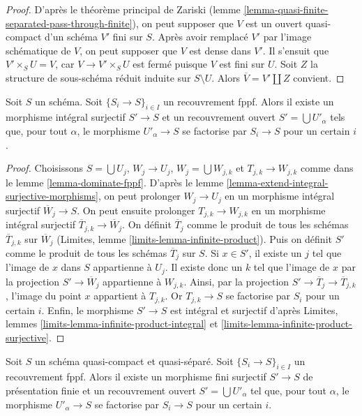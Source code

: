 \begin{proof}
D'après le théorème principal de Zariski
(lemme \ref{lemma-quasi-finite-separated-pass-through-finite}),
on peut supposer que $V$ est un ouvert quasi-compact d'un schéma $V'$
fini sur $S$. Après avoir remplacé $V'$ par l'image schématique
de $V$, on peut supposer que $V$ est dense dans $V'$.
Il s'ensuit que $V' \times_S U = V$, car $V \to V' \times_S U$
est fermé puisque $V$ est fini sur $U$. Soit $Z$ la structure de sous-schéma réduit
induite sur $S \setminus U$. Alors
$\overline{V} = V' \amalg Z$ convient.
\end{proof}

\begin{lemma}
\label{lemma-dominate-fppf-integral}
Soit $S$ un schéma. Soit $\{S_i \to S\}_{i \in I}$ un recouvrement fppf.
Alors il existe un morphisme intégral surjectif $S' \to S$ et un
recouvrement ouvert $S' = \bigcup U'_\alpha$ tels que, pour tout $\alpha$, le
morphisme $U'_\alpha \to S$ se factorise par $S_i \to S$ pour un certain $i$.
\end{lemma}

\begin{proof}
Choisissons $S = \bigcup U_j$, $W_j \to U_j$, $W_j = \bigcup W_{j, k}$ et
$T_{j, k} \to W_{j, k}$ comme dans le lemme \ref{lemma-dominate-fppf}.
D'après le lemme \ref{lemma-extend-integral-surjective-morphisms},
on peut prolonger $W_j \to U_j$ en un morphisme intégral surjectif
$\overline{W}_j \to S$.
On peut ensuite prolonger $T_{j, k} \to W_{j, k}$ en un morphisme
intégral surjectif $\overline{T}_{j, k} \to \overline{W}_j$.
On définit $\overline{T}_j$ comme le produit de tous les schémas
$\overline{T}_{j, k}$ sur $\overline{W}_j$
(Limites, lemme \ref{limits-lemma-infinite-product}).
Puis on définit $S'$ comme le produit de tous les schémas
$\overline{T}_j$ sur $S$.
Si $x \in S'$, il existe un $j$ tel que l'image de $x$ dans
$S$ appartienne à $U_j$. Il existe donc un $k$ tel que l'image de
$x$ par la projection $S' \to \overline{W}_j$ appartienne à $W_{j, k}$.
Ainsi, par la projection $S' \to \overline{T}_j \to \overline{T}_{j, k}$,
l'image du point $x$ appartient à $T_{j, k}$. Or $T_{j, k} \to S$
se factorise par $S_i$ pour un certain $i$.
Enfin, le morphisme $S' \to S$ est intégral et surjectif
d'après Limites, lemmes \ref{limits-lemma-infinite-product-integral} et
\ref{limits-lemma-infinite-product-surjective}.
\end{proof}

\begin{lemma}
\label{lemma-dominate-fppf-finite}
Soit $S$ un schéma quasi-compact et quasi-séparé.
Soit $\{S_i \to S\}_{i \in I}$ un recouvrement fppf.
Alors il existe un morphisme fini surjectif $S' \to S$
de présentation finie et un
recouvrement ouvert $S' = \bigcup U'_\alpha$ tel que, pour tout $\alpha$, le
morphisme $U'_\alpha \to S$ se factorise par $S_i \to S$ pour un certain $i$.
\end{lemma}


